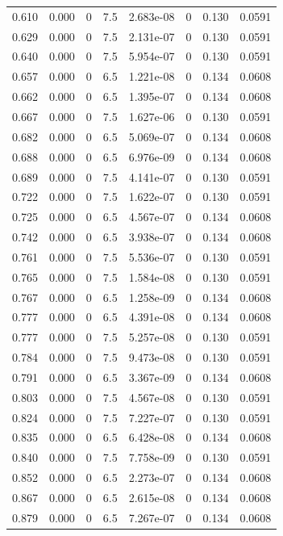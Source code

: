 \documentclass[preview]{standalone}
\begin{document}
{{{\begin{tabular}{L{1.2cm}C{1.2cm} C{0.3cm}C{0.5cm} C{1.4cm}C{1.4cm} C{1.4cm}C{1.4cm}}
  0.610  &  0.000  & 0     & 7.5 &  2.683e-08  & 0  & 0.130 &  0.0591   \\ 
  0.629  &  0.000  & 0     & 7.5 &  2.131e-07  & 0  & 0.130 &  0.0591   \\ 
  0.640  &  0.000  & 0     & 7.5 &  5.954e-07  & 0  & 0.130 &  0.0591   \\ 
  0.657  &  0.000  & 0     & 6.5 &  1.221e-08  & 0  & 0.134 &  0.0608   \\ 
  0.662  &  0.000  & 0     & 6.5 &  1.395e-07  & 0  & 0.134 &  0.0608   \\ 
  0.667  &  0.000  & 0     & 7.5 &  1.627e-06  & 0  & 0.130 &  0.0591   \\ 
  0.682  &  0.000  & 0     & 6.5 &  5.069e-07  & 0  & 0.134 &  0.0608   \\ 
  0.688  &  0.000  & 0     & 6.5 &  6.976e-09  & 0  & 0.134 &  0.0608   \\ 
  0.689  &  0.000  & 0     & 7.5 &  4.141e-07  & 0  & 0.130 &  0.0591   \\ 
  0.722  &  0.000  & 0     & 7.5 &  1.622e-07  & 0  & 0.130 &  0.0591   \\ 
  0.725  &  0.000  & 0     & 6.5 &  4.567e-07  & 0  & 0.134 &  0.0608   \\ 
  0.742  &  0.000  & 0     & 6.5 &  3.938e-07  & 0  & 0.134 &  0.0608   \\ 
  0.761  &  0.000  & 0     & 7.5 &  5.536e-07  & 0  & 0.130 &  0.0591   \\ 
  0.765  &  0.000  & 0     & 7.5 &  1.584e-08  & 0  & 0.130 &  0.0591   \\ 
  0.767  &  0.000  & 0     & 6.5 &  1.258e-09  & 0  & 0.134 &  0.0608   \\ 
  0.777  &  0.000  & 0     & 6.5 &  4.391e-08  & 0  & 0.134 &  0.0608   \\ 
  0.777  &  0.000  & 0     & 7.5 &  5.257e-08  & 0  & 0.130 &  0.0591   \\ 
  0.784  &  0.000  & 0     & 7.5 &  9.473e-08  & 0  & 0.130 &  0.0591   \\ 
  0.791  &  0.000  & 0     & 6.5 &  3.367e-09  & 0  & 0.134 &  0.0608   \\ 
  0.803  &  0.000  & 0     & 7.5 &  4.567e-08  & 0  & 0.130 &  0.0591   \\ 
  0.824  &  0.000  & 0     & 7.5 &  7.227e-07  & 0  & 0.130 &  0.0591   \\ 
  0.835  &  0.000  & 0     & 6.5 &  6.428e-08  & 0  & 0.134 &  0.0608   \\ 
  0.840  &  0.000  & 0     & 7.5 &  7.758e-09  & 0  & 0.130 &  0.0591   \\ 
  0.852  &  0.000  & 0     & 6.5 &  2.273e-07  & 0  & 0.134 &  0.0608   \\ 
  0.867  &  0.000  & 0     & 6.5 &  2.615e-08  & 0  & 0.134 &  0.0608   \\ 
  0.879  &  0.000  & 0     & 6.5 &  7.267e-07  & 0  & 0.134 &  0.0608   \\ 
\hline 
\end{tabular} 

}}}
\end{document}
